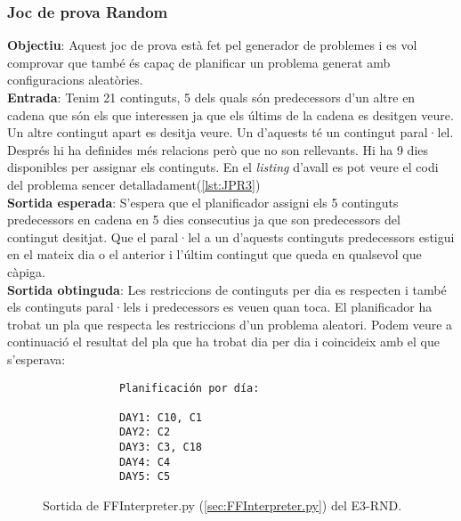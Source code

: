 \documentclass[a4paper]{article}
\begin{document}
	\subsubsection*{Joc de prova Random}
	
	\noindent \textbf{Objectiu}: Aquest joc de prova està fet pel generador de problemes i es vol comprovar que també és capaç de planificar un problema generat amb configuracions aleatòries. \\
	
	\noindent \textbf{Entrada}: Tenim 21 continguts, 5 dels quals són predecessors d'un altre en cadena que són els que interessen ja que els últims de la cadena es desitgen veure. Un altre contingut apart es desitja veure. Un d'aquests té un contingut paral·lel. Després hi ha definides més relacions però que no son rellevants. Hi ha 9 dies disponibles per assignar els continguts. En el \textit{listing} d'avall es pot veure el codi del problema sencer detalladament(\ref{lst:JPR3}) \\
	
	\noindent \textbf{Sortida esperada}: S'espera que el planificador assigni els 5 continguts predecessors en cadena en 5 dies consecutius ja que son predecessors del contingut desitjat. Que el paral·lel a un d'aquests continguts predecessors estigui en el mateix dia o el anterior i l'últim contingut que queda en qualsevol que càpiga. \\
	
	\noindent \textbf{Sortida obtinguda}: Les restriccions de continguts per dia es respecten i també els continguts paral·lels i predecessors es veuen quan toca. El planificador ha trobat un pla que respecta les restriccions d'un problema aleatori.  Podem veure a continuació el resultat del pla que ha trobat dia per dia i coincideix amb el que s'esperava:\\
	
	\begin{figure}[H]
		\centering
		\begin{verbatim}
			Planificación por día:
			
			DAY1: C10, C1
			DAY2: C2
			DAY3: C3, C18
			DAY4: C4
			DAY5: C5
		\end{verbatim}
		\caption{Sortida de FFInterpreter.py (\ref{sec:FFInterpreter.py}) del E3-RND.}
	\end{figure}
	
\end{document}
